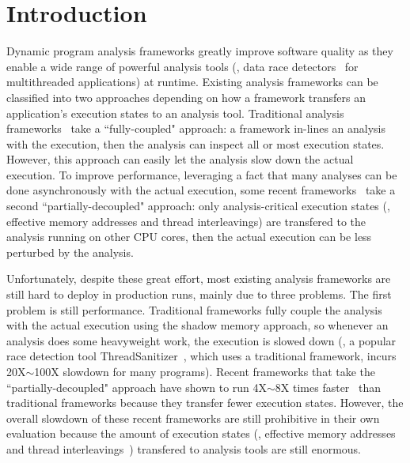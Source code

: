 \section{Introduction} \label{sec:intro}



Dynamic program analysis frameworks greatly improve software quality as they
enable a wide range of powerful analysis tools (\eg, data race
detectors~\cite{tsan, valgrind:pldi, wester:parallelizing:asplos13} for
multithreaded applications) at runtime. Existing analysis frameworks can be
classified into two approaches depending on how a framework transfers an
application's execution states to an analysis tool. Traditional analysis
frameworks~\cite{dynamorio, pin:pldi05, valgrind:pldi, lift:micro06, tsan} take
a ``fully-coupled" approach: a framework in-lines an analysis with the
execution, then the analysis can inspect all or most execution states. However,
this approach can easily let the analysis slow down the actual execution. To
improve performance, leveraging a fact that many analyses can be done
asynchronously with the actual execution, some recent
frameworks~\cite{decouple:usenix08, speck:asplos08, 
shadowreplica:ccs13, wester:parallelizing:asplos13, superpin, jungwoo:oopsla09}
take a second ``partially-decoupled" approach: only analysis-critical execution
states (\eg, effective memory addresses and thread interleavings) are
transfered to the analysis running on other CPU cores, then the actual execution
can be less perturbed by the analysis.




Unfortunately, despite these great effort, most existing analysis frameworks are
still hard to deploy in production runs, mainly due to three problems. The first
problem is still performance. Traditional frameworks fully couple the analysis
with the actual execution using the shadow memory approach, so whenever an
analysis does some heavyweight work, the execution is slowed down (\eg, a
popular race detection tool ThreadSanitizer~\cite{tsan}, which uses a
traditional framework, incurs 20X$\sim$100X slowdown for many programs). Recent
frameworks that take the ``partially-decoupled" approach have shown to run
4X$\sim$8X times faster~\cite{shadowreplica:ccs13,
wester:parallelizing:asplos13} than traditional frameworks because they transfer
fewer 
execution states. However, the overall slowdown of these recent frameworks are
still prohibitive in their own evaluation because the amount of execution states
(\eg, effective memory addresses~\cite{shadowreplica:ccs13} and thread
interleavings~\cite{wester:parallelizing:asplos13}) transfered to analysis tools
are still enormous.


